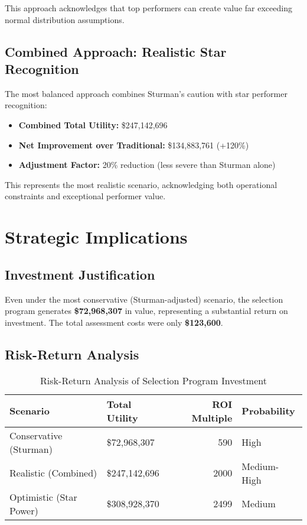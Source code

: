 \documentclass[
]{article}
\providecommand{\tightlist}{%
  \setlength{\itemsep}{0pt}\setlength{\parskip}{0pt}}
\begin{document}
This approach acknowledges that top performers can create value far
exceeding normal distribution assumptions.

\subsection{Combined Approach: Realistic Star
Recognition}\label{combined-approach-realistic-star-recognition}

The most balanced approach combines Sturman's caution with star
performer recognition:

\begin{itemize}
\tightlist
\item
  \textbf{Combined Total Utility:} \$247,142,696
\item
  \textbf{Net Improvement over Traditional:} \$134,883,761 (+120\%)
\item
  \textbf{Adjustment Factor:} 20\% reduction (less severe than Sturman
  alone)
\end{itemize}

This represents the most realistic scenario, acknowledging both
operational constraints and exceptional performer value.

\section{Strategic Implications}\label{strategic-implications}

\subsection{Investment Justification}\label{investment-justification}

Even under the most conservative (Sturman-adjusted) scenario, the
selection program generates \textbf{\$72,968,307} in value, representing
a substantial return on investment. The total assessment costs were only
\textbf{\$123,600}.

\subsection{Risk-Return Analysis}\label{risk-return-analysis}

\begin{longtable}[t]{llrl}
\caption{\label{tab:risk-return-table}Risk-Return Analysis of Selection Program Investment}\\
\toprule
Scenario & Total Utility & ROI Multiple & Probability\\
\midrule
Conservative (Sturman) & \$72,968,307 & 590 & High\\
Realistic (Combined) & \$247,142,696 & 2000 & Medium-High\\
Optimistic (Star Power) & \$308,928,370 & 2499 & Medium\\
\bottomrule
\end{longtable}
\end{document}
